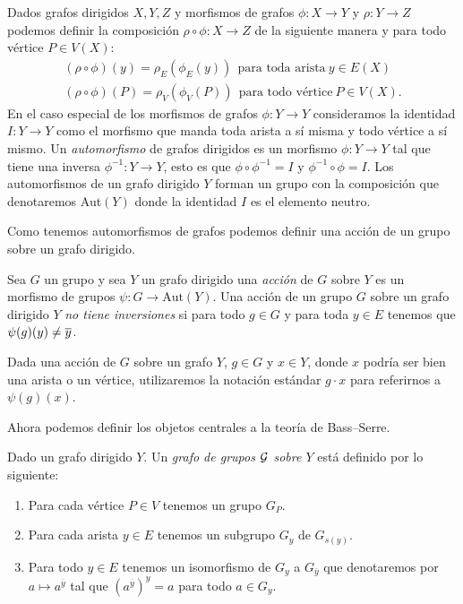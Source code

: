 \documentclass[tesis.tex]{subfiles}
\begin{document}
Dados grafos dirigidos $X,Y,Z$ y morfismos de grafos $\phi:X \to Y$ y $\rho:Y \to Z$ podemos definir la composición $\rho \circ \phi : X \to Z$ de la siguiente manera  y para todo vértice $P \in V(X)$:
\begin{align*}
	(\rho \circ \phi) (y) = \rho_{E} (\phi_{E} (y)) \  \ \text{para toda arista} \ y \in E(X) \\
	(\rho \circ \phi) (P) = \rho_{V} (\phi_{V} (P)) \  \ \text{para todo vértice} \ P \in V(X). 
\end{align*}
En el caso especial de los morfismos de grafos $\phi: Y \to Y$ consideramos la identidad $I: Y \to Y$ como el morfismo que manda toda arista a sí misma y todo vértice a sí mismo.
Un \emph{automorfismo} de grafos dirigidos es un morfismo $\phi:Y \to Y$ tal que tiene una inversa $\phi^{-1}:Y \to Y$, esto es que $\phi \circ \phi^{-1} = I$ y $\phi^{-1} \circ \phi = I$.
Los automorfismos de un grafo dirigido $Y$ forman un grupo con la composición que denotaremos Aut$(Y)$ donde la identidad $I$ es el elemento neutro.

Como tenemos automorfismos de grafos podemos definir una acción de un grupo sobre un grafo dirigido.
\begin{deff}
	Sea $G$ un grupo y sea $Y$ un grafo dirigido una \emph{acción} de $G$ sobre $Y$ es un morfismo de grupos $\psi: G \to \text{Aut}(Y)$.
	Una acción de un grupo $G$ sobre un grafo dirigido $Y$ \emph{no tiene inversiones} si para todo $g \in G$ y para toda $y \in E$ tenemos que $\psi(g)(y) \neq \overline y$.
\end{deff}

Dada una acción de $G$ sobre un grafo $Y$, $g \in G$ y $x \in Y$, donde $x$ podría ser bien una arista o un vértice, utilizaremos la notación estándar $g \cdot x$ para referirnos a $\psi(g)(x)$.


Ahora podemos definir los objetos centrales a la teoría de Bass--Serre.

\begin{deff}
	Dado un grafo dirigido $Y$.
	Un \emph{grafo de grupos $\cal G$ sobre $Y$} está definido por lo siguiente:
	\begin{enumerate}
		\item Para cada vértice $P \in V$ tenemos un grupo $G_P$.
		\item  Para cada arista $y \in E$ tenemos un subgrupo $G_y$ de $G_{s(y)}$.
		\item Para todo $y \in E$ tenemos un isomorfismo de $G_y$ a $G_{\overline y}$ que denotaremos por $a \mapsto a^{\overline y} $ tal que $(a^{\overline y})^y  = a$ para todo $a \in G_y$.
	\end{enumerate}
\end{deff}
\end{document}
